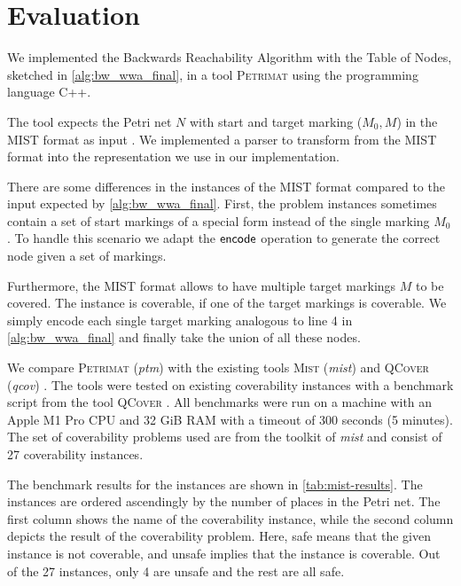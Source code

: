\chapter{Evaluation}\label{chapter:evaluation}
We implemented the Backwards Reachability Algorithm with the Table of Nodes, sketched in \autoref{alg:bw_wwa_final}, in a tool \textsc{Petrimat} using the programming language C++. 

The tool expects the Petri net $N$ with start and target marking ($M_{0},M$) in the MIST format as input \cite{ganty_15}. We implemented a parser to transform from the MIST format into the representation we use in our implementation. 

There are some differences in the instances of the MIST format compared to the input expected by \autoref{alg:bw_wwa_final}. First, the problem instances sometimes contain a set of start markings of a special form instead of the single marking $M_{0}$. To handle this scenario we adapt the $\operatorname{\textsf{encode}}$ operation to generate the correct node given a set of markings. 

Furthermore, the MIST format allows to have multiple target markings $M$ to be covered. The instance is coverable, if one of the target markings is coverable. We simply encode each single target marking analogous to line 4 in \autoref{alg:bw_wwa_final} and finally take the union of all these nodes.

We compare \textsc{Petrimat} (\textit{ptm}) with the existing tools \textsc{Mist} (\textit{mist}) and \textsc{QCover} (\textit{qcov})  \cite{ganty_15,blondin_15}. 
The tools were tested on existing coverability instances with a benchmark script from the tool \textsc{QCover} \cite{blondin_15}.  All benchmarks were run on a machine with an Apple M1 Pro CPU and 32 GiB RAM with a timeout of 300 seconds (5 minutes). 
The set of coverability problems used are from the toolkit of \textit{mist} and consist of 27 coverability instances. 

\bigbreak

The benchmark results for the instances are shown in \autoref{tab:mist-results}.
The instances are ordered ascendingly by the number of places in the Petri net. The first column shows the name of the coverability instance, while the second column depicts the result of the coverability problem. Here, safe means that the given instance is not coverable, and unsafe implies that the instance is coverable.
Out of the 27 instances, only 4 are unsafe and the rest are all safe. 

